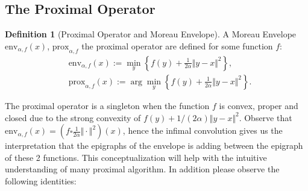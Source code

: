 \documentclass[]{article}
\theoremstyle{definition}
\newtheorem{definition}{Definition}
\begin{document}
    \subsection{The Proximal Operator}
        \begin{definition}[Proximal Operator and Moreau Envelope]
            A Moreau Envelope $\text{env}_{\alpha, f}(x)$, $\text{prox}_{\alpha, f}$ the proximal operator are defined for some function $f$: 
            $$
            \begin{aligned}
                & \text{env}_{\alpha, f}(x) := \min_{y}\left\lbrace
                    f(y) + \frac{1}{2 \alpha }\Vert y - x\Vert^2
                \right\rbrace, 
                \\
                & \text{prox}_{\alpha,f}(x) := 
                \arg\min_{y}\left\lbrace
                    f(y) + \frac{1}{2\alpha} \Vert y - x\Vert^2
                \right\rbrace. 
            \end{aligned}
            $$
        \end{definition}
        
        The proximal operator is a singleton when the function $f$ is convex, proper and closed due to the strong convexity of $f(y) + 1/(2\alpha)\Vert y - x\Vert^2$. Observe that $\text{env}_{\alpha, f}(x) = (f\square \frac{1}{2\alpha}\Vert \cdot \Vert^2)(x)$, hence the infimal convolution gives us the interpretation that the epigraphs of the envelope is adding between the epigraph of these 2 functions. This conceptualization will help with the intuitive understanding of many proximal algorithm. 
        In addition please observe the following identities: 
\end{document}
